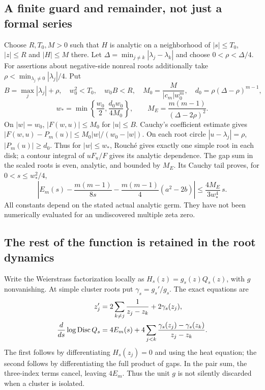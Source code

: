 \documentclass[11pt,a4paper]{article}
\theoremstyle{definition}\newtheorem{definition}[theorem]{Definition}\newtheorem{remark}[theorem]{Remark}
\begin{document}
\subsection{A finite guard and remainder, not just a formal series}
Choose $R,T_0,M>0$ such that $H$ is analytic on a neighborhood of $|s|\le T_0$, $|z|\le R$ and $|H|\le M$ there. Let $\Delta=\min_{j\ne k}|\lambda_j-\lambda_k|$ and choose $0<\rho<\Delta/4$. For assertions about negative-side nonreal roots additionally take $\rho<\min_{\lambda_j\ne0}|\lambda_j|/4$. Put
\[
 B=\max_j|\lambda_j|+\rho,\quad w_0^2<T_0,\quad w_0B<R,
 \quad M_0=\frac{M}{|c_m|w_0^m},\quad
 d_0=\rho(\Delta-\rho)^{m-1},
\]
\begin{equation}
 w_* =\min\left\{\frac{w_0}{2},\frac{d_0w_0}{4M_0}\right\},
 \qquad M_E=\frac{m(m-1)}{(\Delta-2\rho)^2}.              \label{eq:guard}
\end{equation}
On $|w|=w_0$, $|F(w,u)|\le M_0$ for $|u|\le B$. Cauchy's coefficient estimate gives
$|F(w,u)-P_m(u)|\le M_0|w|/(w_0-|w|)$. On each root circle $|u-\lambda_j|=\rho$, $|P_m(u)|\ge d_0$. Thus for $|w|\le w_*$, Rouch\'e gives exactly one simple root in each disk; a contour integral of $uF_u/F$ gives its analytic dependence. The gap sum in the scaled roots is even, analytic, and bounded by $M_E$. Its Cauchy tail proves, for $0<s\le w_*^2/4$,
\begin{equation}
 \left|E_m(s)-\frac{m(m-1)}{8s}
          -\frac{m(m-1)}4(a^2-2b)\right|
 \le \frac{4M_E}{3w_*^4}\,s.                             \label{eq:energyerror}
\end{equation}
All constants depend on the stated actual analytic germ. They have not been numerically evaluated for an undiscovered multiple zeta zero.

\subsection{The rest of the function is retained in the root dynamics}
Write the Weierstrass factorization locally as $H_s(z)=g_s(z)Q_s(z)$, with $g$ nonvanishing. At simple cluster roots put $\gamma_s=g_s'/g_s$. The exact equations are
\begin{align}
 z_j'&=2\sum_{k\ne j}\frac1{z_j-z_k}+2\gamma_s(z_j),      \label{eq:environment}\\
 \frac d{ds}\log\operatorname{Disc} Q_s
 &=4E_m(s)+4\sum_{j<k}\frac{\gamma_s(z_j)-\gamma_s(z_k)}{z_j-z_k}.
                                                        \label{eq:discenv}
\end{align}
The first follows by differentiating $H_s(z_j)=0$ and using the heat equation; the second follows by differentiating the full product of gaps. In the pair sum, the three-index terms cancel, leaving $4E_m$. Thus the unit $g$ is not silently discarded when a cluster is isolated.
\end{document}
